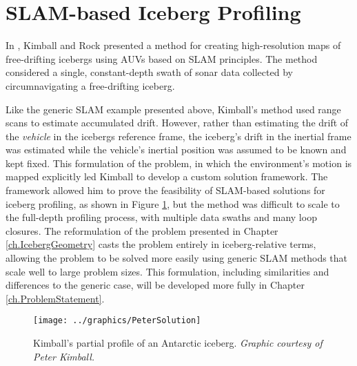 \section{SLAM-based Iceberg Profiling}

In \cite{Kimball2011b}, Kimball and Rock presented a method for creating high-resolution maps of free-drifting icebergs using AUVs based on SLAM principles. The method considered a single, constant-depth swath of sonar data collected by circumnavigating a free-drifting iceberg. 

Like the generic SLAM example presented above, Kimball's method used range scans to estimate accumulated drift. However, rather than estimating the drift of the \emph{vehicle} in the icebergs reference frame, the iceberg's drift in the inertial frame was estimated while the vehicle's inertial position was assumed to be known and kept fixed. This formulation of the problem, in which the environment's motion is mapped explicitly led Kimball to develop a custom solution framework. The framework allowed him to prove the feasibility of SLAM-based solutions for iceberg profiling, as shown in Figure \ref{fig:KimballSolution}, but the method was difficult to scale to the full-depth profiling process, with multiple data swaths and many loop closures. The reformulation of the problem presented in Chapter \ref{ch.IcebergGeometry} casts the problem entirely in iceberg-relative terms, allowing the problem to be solved more easily using generic SLAM methods that scale well to large problem sizes. This formulation, including similarities and differences to the generic case, will be developed more fully in Chapter \ref{ch.ProblemStatement}.

 \begin{figure}[!htb]
   \centering
   \texttt{[image: ../graphics/PeterSolution]} %
   \caption{Kimball's partial profile of an Antarctic iceberg. \emph{Graphic courtesy of Peter Kimball.}}
   \label{fig:KimballSolution}
\end{figure}


